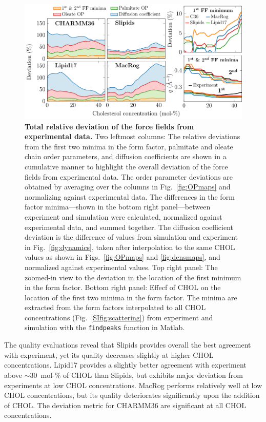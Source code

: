 \documentclass[journal=jctcce]{achemso}
\begin{document}
\begin{figure}[htb!]
  \centering
  \includegraphics[width=\linewidth]{../FIGS/deviation.pdf}
  \caption{\label{fig:deviation}%
  \textbf{Total relative deviation of the force fields from experimental data.} 
%
  Two leftmost columns:
  The relative deviations from the first two minima in the form factor, palmitate and oleate chain order parameters, and diffusion coefficients are shown in a cumulative manner to highlight the overall deviation of the force fields from experimental data.
  The order parameter deviations are obtained by averaging over the columns in Fig.~\ref{fig:OPmaps} and normalizing against experimental data. The differences in the form factor minima---shown in the bottom right panel---between experiment and simulation were calculated, normalized against experimental data, and summed together. The diffusion coefficient deviation is the difference of values from simulation and experiment in Fig.~\ref{fig:dynamics}, taken after interpolation to the same CHOL values as shown in Figs.~\ref{fig:OPmaps} and \ref{fig:densmaps}, and normalized against experimental values.
%
  Top right panel: 
  The zoomed-in view to the deviation in the location of the first minimum in the form factor.
%
  Bottom right panel:
  Effecf of CHOL on the location of the first two minima in the form factor. The minima are extracted from the form factors interpolated to all CHOL concentrations (Fig.~\ref{SIfig:scattering}) from experiment and simulation with the \texttt{findpeaks} function in Matlab.
  }
\end{figure}

The quality evaluations reveal that Slipids provides overall the best agreement with experiment, yet its quality decreases slightly at higher CHOL concentrations. Lipid17 provides a slightly better agreement with experiment above $\sim$30~mol-\% of CHOL than Slipids, but exhibits major deviation from experiments at low CHOL concentrations. MacRog performs relatively well at low CHOL concentrations, but its quality deteriorates significantly upon the addition of CHOL. The deviation metric for CHARMM36 are significant at all CHOL concentrations. 
\end{document}
